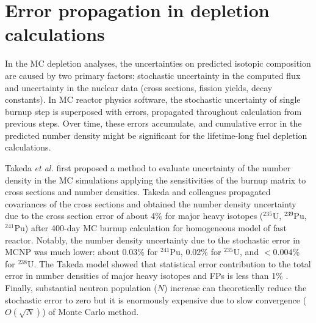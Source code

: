 \chapter{Error propagation in depletion calculations}
In the \gls{MC} depletion analyses, the uncertainties on predicted isotopic 
composition are caused by two primary factors: stochastic uncertainty in 
the computed flux and uncertainty in the nuclear data (cross sections, fission 
yields, decay constants). In \gls{MC} reactor physics software, the stochastic 
uncertainty of single burnup step is superposed with errors, propagated 
throughout calculation from previous steps. Over time, these errors 
accumulate, and cumulative error in the predicted number density might be 
significant for the lifetime-long fuel depletion calculations.

Takeda \emph{et al.} first proposed a method to evaluate uncertainty of the 
number density in the \gls{MC} simulations applying the sensitivities of the 
burnup matrix to cross sections and number densities. Takeda and colleagues 
propagated covariances of the cross sections and obtained the number 
density uncertainty due to the cross section error of about 4\% for major 
heavy isotopes ($^{235}$U, $^{239}$Pu, $^{241}$Pu) after 400-day 
\gls{MC} burnup calculation for homogeneous model of fast reactor. Notably, 
the number density uncertainty due to the stochastic error in MCNP was 
much lower: about 0.03\% for $^{241}$Pu, 0.02\% for $^{235}$U, and $<0.004$\% 
for $^{238}$U. The Takeda model showed that statistical error contribution to 
the total error in number densities of major heavy isotopes and \glspl{FP} is 
less than 1\% \cite{takeda_estimation_1999}. Finally, substantial neutron 
population ($N$) increase can theoretically reduce the stochastic error to 
zero but it is enormously expensive due to slow convergence ($O(\sqrt{N})$) of 
Monte Carlo method.

